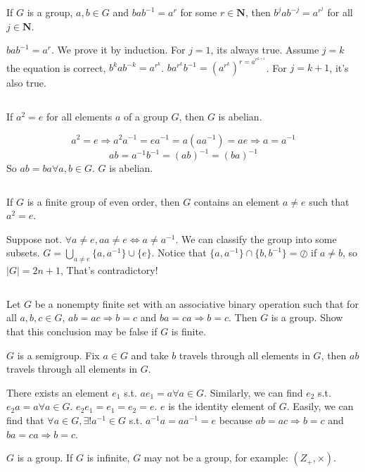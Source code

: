 $$ $$

\begin{ex}
    If $G$ is a group, $a,b\in G$ and $bab^{-1}=a^{r}$ for some $r\in \mathbf{N}$, then $b^{j}ab^{-j}=a^{r^{j}}$ for all $j\in \mathbf{N}$. 
\end{ex}

\begin{answer}
    $bab^{-1}= a^{r}$. We prove it by induction. For $j=1$, its always true. Assume $j=k$ the equation is correct, $b^{k}ab^{-k}=a^{r^{k}}$. $ba^{r^{k}}b^{-1}=(a^{r^{k}})^{r=a^{r^{k+1}}}$. For $j=k+1$, it's also true.
\end{answer}

$$ $$

\begin{ex}
    If $a^{2}=e$ for all elements $a$ of a group $G$, then $G$ is abelian.
\end{ex}

\begin{answer}
    \[a^{2}=e\Rightarrow a^{2}a^{-1}=ea^{-1}=a(aa^{-1})=ae\Rightarrow a=a^{-1}\]\[ab=a^{-1}b^{-1}=(ab)^{-1}=(ba)^{-1}\]So  $ab=ba \forall a,b \in G$. $G$ is abelian.
\end{answer}

$$ $$

\begin{ex}
    If $G$ is a finite group of even order, then $G$ contains an element $a\neq e$ such that $a^{2}=e$.
\end{ex}

\begin{answer}
    Suppose not. $\forall a\neq e, aa\neq e \Leftrightarrow a\neq a^{-1}$. We can classify the group into some subsets. $G=\bigcup\limits_{a\neq e}\{a,a^{-1}\}\cup\{e\}$. Notice that $\{a,a^{-1}\}\cap\{b,b^{-1}\}=\oslash$ if $a\neq b$, so $\left| G \right| =2n+1$, That's contradictory!
\end{answer}

$$ $$

\begin{ex}
    Let $G$ be a nonempty finite set with an associative binary operation such that for all $a, b, c\in G$, $ab = ac\Rightarrow b = c$ and $ba  =ca \Rightarrow b = c$. Then $G$ is a group. Show that this conclusion may be false if $G$ is finite.
\end{ex}

\begin{answer}
    $G$ is a semigroup. Fix $a\in G$ and take $b$ travels through all elements in $G$, then $ab$ travels through all elements in $G$.

    There exists an element $e_1$ s.t. $ae_1=a\forall a\in G$. Similarly, we can find $e_2$ s.t. $e_2a=a\forall a\in G$. $e_2e_1=e_1=e_2=e$. $e$ is the identity element of $G$. Easily, we can find that $\forall a\in G, \exists ! a^{-1}\in G$ s.t. $a^{-1}a=aa^{-1}=e$ because $ab = ac\Rightarrow b = c$ and $ba  =ca \Rightarrow b = c$.

    $G$ is a group. If $G$ is infinite, $G$ may not be a group, for example: $(Z_+,\times)$.
\end{answer}

